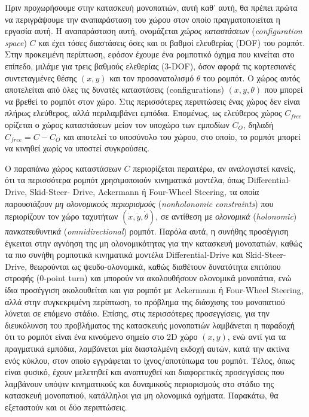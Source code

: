 \bigskip
Πριν προχωρήσουμε στην κατασκευή μονοπατιών, αυτή καθ' αυτή, θα πρέπει πρώτα να περιγράψουμε την αναπαράσταση του χώρου στον οποίο πραγματοποιείται η εργασία αυτή. Η αναπαράσταση αυτή, ονομάζεται \textit{χώρος καταστάσεων} (\textit{configuration space}) $C$ και έχει τόσες διαστάσεις όσες και οι βαθμοί ελευθερίας (DOF) του ρομπότ. Στην προκειμένη περίπτωση, εφόσον έχουμε ένα ρομποτικό όχημα που κινείται στο επίπεδο, μιλάμε για τρεις βαθμούς ελεθερίας (3-DOF), όσον αφορά τις καρτεσιανές συντεταγμένες θέσης $(x, y)$ και τον προσανατολισμό $\theta$ του ρομπότ. Ο χώρος αυτός αποτελείται από όλες τις δυνατές καταστάσεις (configurations) $(x, y, \theta)$ που μπορεί να βρεθεί το ρομπότ στον χώρο. Στις περισσότερες περιπτώσεις ένας χώρος δεν είναι πλήρως ελεύθερος, αλλά περιλαμβάνει εμπόδια. Επομένως, ως ελεύθερος χώρος $C_{free}$ ορίζεται ο χώρος καταστάσεων μείον τον υποχώρο των εμποδίων $C_O$, δηλαδή $C_{free} = C - C_O$ και αποτελεί το υποσύνολο του χώρου, στο οποίο, το ρομπότ μπορεί να κινηθεί χωρίς να υποστεί συγκρούσεις.

\bigskip
Ο παραπάνω χώρος καταστάσεων $C$ περιορίζεται περαιτέρω, αν αναλογιστεί κανείς, ότι τα περισσότερα ρομπότ χρησιμοποιούν κινηματικά μοντέλα, όπως Differential-Drive, Skid-Steer- Drive, Ackermann ή Four-Wheel Steering, τα οποία παρουσιάζουν \textit{μη ολονομικούς περιορισμούς} (\textit{nonholonomic constraints}) που περιορίζουν τον χώρο ταχυτήτων $(\dot x, \dot y, \dot \theta)$, σε αντίθεση με \textit{ολονομικά} (\textit{holonomic}) \textit{πανκατευθυντικά} (\textit{omnidirectional}) ρομπότ. Παρόλα αυτά, η συνήθης προσέγγιση έγκειται στην αγνόηση της μη ολονομικότητας για την κατασκευή μονοπατιών, καθώς τα πιο συνήθη ρομποτικά κινηματικά μοντέλα Differential-Drive και Skid-Steer-Drive, θεωρούνται ως ψευδο-ολονομικά, καθώς διαθέτουν δυνατότητα επιτόπου στροφής (0-point turn) και μπορούν να ακολουθήσουν ολονομικά μονοπάτια, ενώ ίδια προσέγγιση ακολουθείται και για ρομπότ με Ackermann ή Four-Wheel Steering, αλλά στην συγκεκριμένη περίπτωση, το πρόβλημα της διάσχισης του μονοπατιού λύνεται σε επόμενο στάδιο. Επίσης, στις περισσότερες προσεγγίσεις, για την διευκόλυνση του προβλήματος της κατασκευής μονοπατιών λαμβάνεται η παραδοχή ότι το ρομπότ είναι ένα κινούμενο σημείο στο 2D χώρο $(x, y)$, ενώ αντί για τα πραγματικά εμπόδια, λαμβάνεται μία διασταλμένη εκδοχή αυτών, κατά την ακτίνα ενός κύκλου, στον οποίο εγγράφεται το ίχνος/αποτύπωμα του ρομπότ. Τέλος, όπως είναι φυσικό, έχουν μελετηθεί και αναπτυχθεί και διαφορετικές προσεγγίσεις που λαμβάνουν υπόψιν κινηματικούς και δυναμικούς περιορισμούς στο στάδιο της κατασκευή μονοπατιού, κατάλληλοι για μη ολονομικά οχήματα. Παρακάτω, θα εξεταστούν και οι δύο περιπτώσεις.

